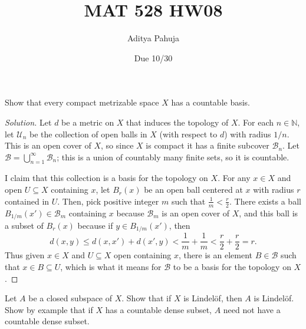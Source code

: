 \documentclass[10pt]{article}
\title{MAT 528 HW08}
\author{\large Aditya Pahuja}
\date{\large Due 10/30}
\providecommand{\NN}{\mathbb N}
\newenvironment{soln}{\begin{proof}[Solution]}{\end{proof}}
\begin{document}
\maketitle

\begin{problem}[Munkres 30.4]
    Show that every compact metrizable space $X$ has a countable basis.
\end{problem}

\begin{soln}
    Let $d$ be a metric on $X$ that induces the topology of $X$.
    For each $n\in\NN$, let $\mathcal U_n$ be the collection of
    open balls in $X$ (with respect to $d$) with radius $1/n$.
    This is an open cover of $X$,
    so since $X$ is compact it has a finite subcover $\mathcal B_n$.
    Let $\mathcal B = \bigcup_{n=1}^\infty\mathcal B_n$;
    this is a union of countably many finite sets, so it is countable.

    I claim that this collection is a basis for the topology on $X$.
    For any $x\in X$ and open $U\subseteq X$ containing $x$,
    let $B_r(x)$ be an open ball centered at $x$ with radius $r$
    contained in $U$. Then, pick positive integer $m$
    such that $\frac 1m < \frac r{2}$. There exists a ball
    $B_{1/m}(x')\in\mathcal B_m$ containing $x$ because $\mathcal B_m$
    is an open cover of $X$, and this ball is a subset of $B_r(x)$ because
    if $y\in B_{1/m}(x')$, then
    \begin{equation*}
        d(x,y) \le d(x,x') + d(x',y) < \frac 1m + \frac 1m
	< \frac r2 + \frac r2 = r.
    \end{equation*}
    Thus given $x\in X$ and $U\subseteq X$ open containing $x$,
    there is an element $B\in \mathcal B$ such that
    $x\in B\subseteq U$, which is what it means
    for $\mathcal B$ to be a basis for the topology on $X$.
\end{soln}

\begin{problem}[Munkres 30.9]
    Let $A$ be a closed subspace of $X$. Show that if $X$ is Lindel\"of,
    then $A$ is Lindel\"of. Show by example that if $X$ has
    a countable dense subset, $A$ need not have a countable dense subset.
\end{problem}
\end{document}
